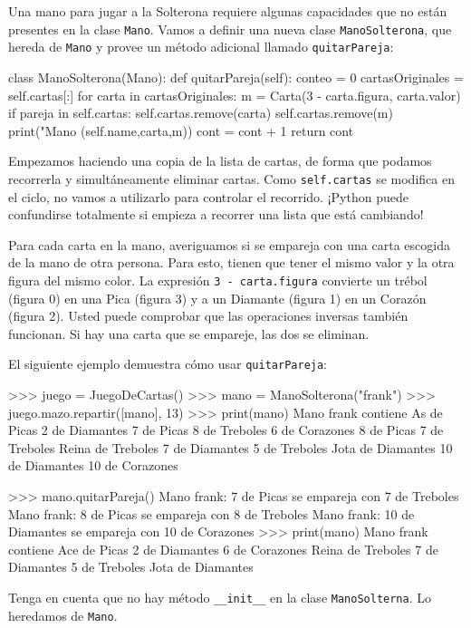 
Una mano para jugar a la Solterona requiere algunas capacidades que
no están presentes en la clase \texttt{Mano}. Vamos a definir una
nueva clase \texttt{ManoSolterona}, que hereda de \texttt{Mano} y
provee un método adicional llamado \texttt{quitarPareja}:

\begin{pythoncode}
class ManoSolterona(Mano):
  def quitarPareja(self):
    conteo = 0
    cartasOriginales = self.cartas[:]
    for carta in cartasOriginales:
      m = Carta(3 - carta.figura, carta.valor)
      if pareja in self.cartas:
        self.cartas.remove(carta)
        self.cartas.remove(m)
        print("Mano %
              (self.name,carta,m))
        cont = cont + 1
    return cont
\end{pythoncode}
 Empezamos haciendo una copia de la lista de cartas, de forma que
podamos recorrerla y simultáneamente eliminar cartas. Como \texttt{self.cartas}
se modifica en el ciclo, no vamos a utilizarlo para controlar el recorrido.
¡Python puede confundirse totalmente si empieza a recorrer una lista
que está cambiando!


Para cada carta en la mano, averiguamos si se empareja con una carta
escogida de la mano de otra persona. Para esto, tienen que tener el
mismo valor y la otra figura del mismo color. La expresión \texttt{3
- carta.figura} convierte un trébol (figura 0) en una Pica (figura
3) y a un Diamante (figura 1) en un Corazón (figura 2). Usted puede
comprobar que las operaciones inversas también funcionan. Si hay una
carta que se empareje, las dos se eliminan.

El siguiente ejemplo demuestra cómo usar \texttt{quitarPareja}:

\begin{pyconcode}
>>> juego = JuegoDeCartas()
>>> mano = ManoSolterona("frank")
>>> juego.mazo.repartir([mano], 13)
>>> print(mano)
Mano frank contiene
As de Picas
 2 de Diamantes
  7 de Picas
   8 de Treboles
    6 de Corazones
     8 de Picas
      7 de Treboles
       Reina de Treboles
        7 de Diamantes
         5 de Treboles
          Jota de Diamantes
           10 de Diamantes
            10 de Corazones

>>> mano.quitarPareja()
Mano frank: 7 de Picas se empareja con 7 de Treboles
Mano frank: 8 de Picas se empareja con 8 de Treboles
Mano frank: 10 de Diamantes se empareja con 10 de Corazones
>>> print(mano)
Mano frank contiene
Ace de Picas
 2 de Diamantes
  6 de Corazones
   Reina de Treboles
    7 de Diamantes
     5 de Treboles
      Jota de Diamantes
\end{pyconcode}
 Tenga en cuenta que no hay método \texttt{\_\_init\_\_} en la clase
\texttt{ManoSolterna}. Lo heredamos de \texttt{Mano}.

